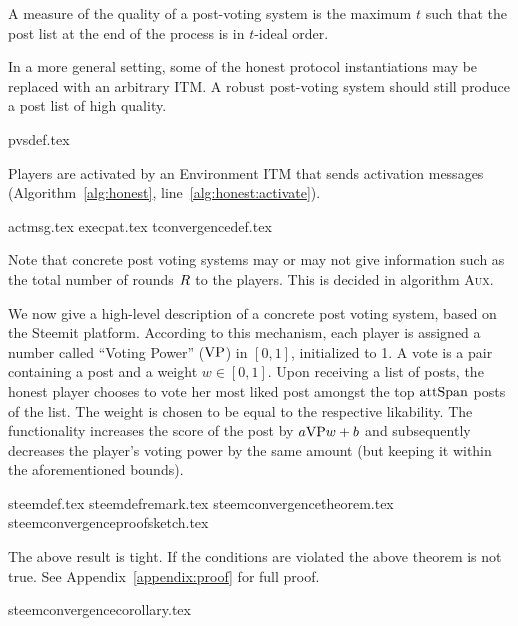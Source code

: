     A measure of the quality of a post-voting system is the maximum $t$ such
    that the post list at the end of the process is in $t$-ideal order.

    In a more general setting, some of the honest protocol instantiations may be
    replaced with an arbitrary ITM. A robust post-voting system should still
    produce a post list of high quality.

    {pvsdef.tex}

    \noindent Players are activated by an Environment ITM that sends activation
    messages (Algorithm~\ref{alg:honest}, line~\ref{alg:honest:activate}).

    {actmsg.tex}
    {execpat.tex}
    {tconvergencedef.tex}

    \noindent Note that concrete post voting systems may or may not give
    information such as the total number of rounds $R$ to the players.
    This is decided in algorithm \textsc{Aux}.

    We now give a high-level description of a concrete post voting system, based
    on the Steemit platform. According to this mechanism, each player is
    assigned a number called ``Voting Power'' ($\mathrm{VP}$) in $\left[0,
    1\right]$, initialized to 1. A vote is a pair containing a post and a weight
    $w \in \left[0, 1\right]$. Upon receiving a list of posts, the honest player
    chooses to vote her most liked post amongst the top $\mathrm{attSpan}$ posts of the
    list. The weight is chosen to be equal to the respective likability. The
    functionality increases the score of the post by $a \mathrm{VP} w + b$ and
    subsequently decreases the player's voting power by the same amount (but
    keeping it within the aforementioned bounds).

    {steemdef.tex}
    {steemdefremark.tex}
    {steemconvergencetheorem.tex}
    {steemconvergenceproofsketch.tex}

    The above result is tight. If the conditions are violated the above theorem
    is not true. See Appendix~\ref{appendix:proof} for full proof.

    {steemconvergencecorollary.tex}

